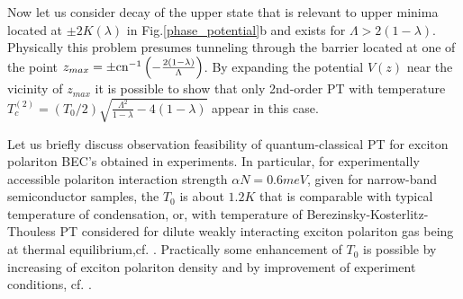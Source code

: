 \documentclass[aps, pre, preprint, groupedaddress, superscriptaddress, showkeys, showpacs] {revtex4-1}
\begin{document}
Now let us consider decay of the upper state that is relevant to  upper minima located at $\pm 2K(\lambda)$ in Fig.\ref{phase_potential}b and exists for $\Lambda > 2(1 - \lambda)$. Physically this problem presumes tunneling through the barrier located at one of the point $z_{max} = \pm \textrm{cn}^{-1} \left( -\frac{2(1 - \lambda)}{\Lambda} \right)$.
By expanding the potential $V(z)$ near the vicinity of $z_{max}$ it is possible to show that only 2nd-order PT with temperature $T_{c}^{(2)} = (T_{0}/ 2) \sqrt{\frac{\Lambda^2}{1 - \lambda} - 4(1 - \lambda)}$ appear in this case.

Let us briefly discuss observation feasibility of quantum-classical PT for exciton polariton BEC's obtained in experiments. In particular, for experimentally accessible polariton interaction strength $\alpha N=0.6meV$, given for narrow-band semiconductor samples, the  $T_{0}$ is about $1.2K$ that is comparable with typical temperature of condensation, or, with temperature of Berezinsky-Kosterlitz-Thouless PT considered for dilute weakly interacting exciton polariton gas being at thermal equilibrium,cf. \cite{Sanvitto,Guillet}. Practically some enhancement of $T_{0}$ is possible by increasing of exciton polariton density and by improvement of experiment conditions, cf. \cite{Snoke_2017}.  
%
%
\end{document}
